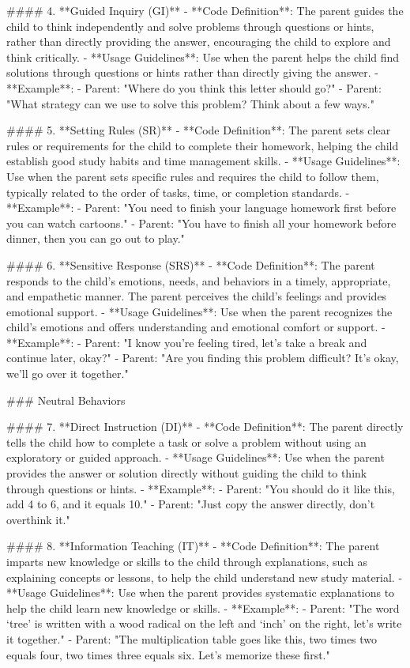 \begin{spverbatim}
#### 4. **Guided Inquiry (GI)**
- **Code Definition**: The parent guides the child to think independently and solve problems through questions or hints, rather than directly providing the answer, encouraging the child to explore and think critically.
- **Usage Guidelines**: Use when the parent helps the child find solutions through questions or hints rather than directly giving the answer.
- **Example**:  
  - Parent: "Where do you think this letter should go?"
  - Parent: "What strategy can we use to solve this problem? Think about a few ways."

#### 5. **Setting Rules (SR)**
- **Code Definition**: The parent sets clear rules or requirements for the child to complete their homework, helping the child establish good study habits and time management skills.
- **Usage Guidelines**: Use when the parent sets specific rules and requires the child to follow them, typically related to the order of tasks, time, or completion standards.
- **Example**:  
  - Parent: "You need to finish your language homework first before you can watch cartoons."
  - Parent: "You have to finish all your homework before dinner, then you can go out to play."

#### 6. **Sensitive Response (SRS)**
- **Code Definition**: The parent responds to the child's emotions, needs, and behaviors in a timely, appropriate, and empathetic manner. The parent perceives the child's feelings and provides emotional support.
- **Usage Guidelines**: Use when the parent recognizes the child’s emotions and offers understanding and emotional comfort or support.
- **Example**:  
  - Parent: "I know you're feeling tired, let's take a break and continue later, okay?"
  - Parent: "Are you finding this problem difficult? It’s okay, we’ll go over it together."

### Neutral Behaviors

#### 7. **Direct Instruction (DI)**
- **Code Definition**: The parent directly tells the child how to complete a task or solve a problem without using an exploratory or guided approach.
- **Usage Guidelines**: Use when the parent provides the answer or solution directly without guiding the child to think through questions or hints.
- **Example**:  
  - Parent: "You should do it like this, add 4 to 6, and it equals 10."
  - Parent: "Just copy the answer directly, don’t overthink it."

#### 8. **Information Teaching (IT)**
- **Code Definition**: The parent imparts new knowledge or skills to the child through explanations, such as explaining concepts or lessons, to help the child understand new study material.
- **Usage Guidelines**: Use when the parent provides systematic explanations to help the child learn new knowledge or skills.
- **Example**:  
  - Parent: "The word ‘tree’ is written with a wood radical on the left and ‘inch’ on the right, let’s write it together."
  - Parent: "The multiplication table goes like this, two times two equals four, two times three equals six. Let’s memorize these first."


\end{spverbatim}
